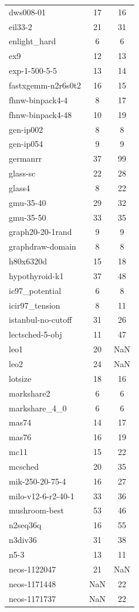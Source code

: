 \begin{longtable}{lcc}
dws008-01 & 17 & 16 \\
eil33-2 & 21 & 31 \\
enlight_hard & 6 & 6 \\
ex9 & 12 & 13 \\
exp-1-500-5-5 & 13 & 14 \\
fastxgemm-n2r6s0t2 & 16 & 15 \\
fhnw-binpack4-4 & 8 & 17 \\
fhnw-binpack4-48 & 10 & 19 \\
gen-ip002 & 8 & 8 \\
gen-ip054 & 9 & 9 \\
germanrr & 37 & 99 \\
glass-sc & 22 & 28 \\
glass4 & 8 & 22 \\
gmu-35-40 & 29 & 32 \\
gmu-35-50 & 33 & 35 \\
graph20-20-1rand & 9 & 9 \\
graphdraw-domain & 8 & 8 \\
h80x6320d & 15 & 18 \\
hypothyroid-k1 & 37 & 48 \\
ic97_potential & 6 & 8 \\
icir97_tension & 8 & 11 \\
istanbul-no-cutoff & 31 & 26 \\
lectsched-5-obj & 11 & 47 \\
leo1 & 20 & NaN \\
leo2 & 24 & NaN \\
lotsize & 18 & 16 \\
markshare2 & 6 & 6 \\
markshare_4_0 & 6 & 6 \\
mas74 & 14 & 17 \\
mas76 & 16 & 19 \\
mc11 & 15 & 22 \\
mcsched & 20 & 35 \\
mik-250-20-75-4 & 16 & 27 \\
milo-v12-6-r2-40-1 & 33 & 36 \\
mushroom-best & 53 & 46 \\
n2seq36q & 16 & 55 \\
n3div36 & 31 & 38 \\
n5-3 & 13 & 11 \\
neos-1122047 & 21 & NaN \\
neos-1171448 & NaN & 22 \\
neos-1171737 & NaN & 22 \\

\end{longtable}
